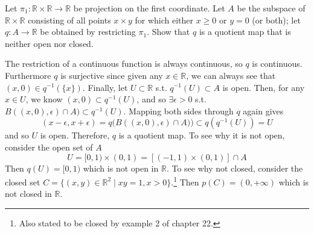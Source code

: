   \begin{exercise}[Munkres 22.3]
    Let $\pi_1 : \mathbb{R} \times \mathbb{R} \to \mathbb{R}$ be projection on the first coordinate. Let $A$ be the subspace of $\mathbb{R} \times \mathbb{R}$ consisting of all points $x \times y$ for which either $x \geq 0$ or $y = 0$ (or both); let $q : A \to \mathbb{R}$ be obtained by restricting $\pi_1$. Show that $q$ is a quotient map that is neither open nor closed.
  \end{exercise}
  \begin{solution} 
    The restriction of a continuous function is always continuous, so $q$ is continuous. Furthermore $q$ is surjective since given any $x \in \mathbb{R}$, we can always see that $(x, 0) \in q^{-1}(\{x\})$. Finally, let $U \subset \mathbb{R}$ s.t. $q^{-1} (U) \subset A$ is open. Then, for any $x \in U$, we know $(x, 0) \subset q^{-1} (U)$, and so  $\exists \epsilon > 0$ s.t. $B((x, 0), \epsilon) \cap A) \subset q^{-1} (U)$. Mapping both sides through $q$ again gives 
    \begin{equation}
      (x - \epsilon, x + \epsilon) = q\big( B((x, 0), \epsilon) \cap A) \big) \subset q (q^{-1}(U)) = U
    \end{equation}
    and so $U$ is open. Therefore, $q$ is a quotient map. To see why it is not open, consider the open set of $A$ 
    \begin{equation}
      U = [0, 1) \times (0, 1) = [(-1, 1) \times (0, 1)] \cap A 
    \end{equation} 
    Then $q(U) = [0, 1)$ which is not open in $\mathbb{R}$. To see why not closed, consider the closed set $C = \{(x, y) \in \mathbb{R}^2 \mid xy = 1, x > 0 \}$.\footnote{Also stated to be closed by example 2 of chapter 22.} Then $p(C) = (0, +\infty)$ which is not closed in $\mathbb{R}$. 
  \end{solution}

